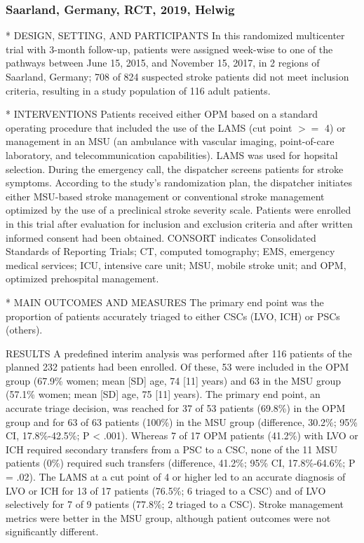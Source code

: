 \subsubsection{Saarland, Germany, RCT, 2019, Helwig \cite{helwig_prehospital_2019}}

\begin{markdown}
* DESIGN, SETTING, AND PARTICIPANTS In this randomized multicenter trial with 3-month follow-up, patients were assigned week-wise to one of the pathways between June 15, 2015, and November 15, 2017, in 2 regions of Saarland, Germany; 708 of 824 suspected stroke patients did not meet inclusion criteria, resulting in a study population of 116 adult patients.

* INTERVENTIONS Patients received either OPM based on a standard operating procedure that included the use of the LAMS (cut point $>=$ 4) or management in an MSU (an ambulance with vascular imaging, point-of-care laboratory, and telecommunication capabilities). LAMS was used for hopsital selection. During the emergency call, the dispatcher screens patients for stroke symptoms. According to the study’s randomization plan, the dispatcher initiates either MSU-based stroke management or conventional stroke management optimized by the use of a preclinical stroke severity scale. Patients were enrolled in this trial after evaluation for inclusion and exclusion criteria and after written informed consent had been obtained. CONSORT indicates Consolidated Standards of Reporting Trials; CT, computed tomography; EMS, emergency medical services; ICU, intensive care unit; MSU, mobile stroke unit; and OPM, optimized prehospital management. 

* MAIN OUTCOMES AND MEASURES The primary end point was the proportion of patients accurately triaged to either CSCs (LVO, ICH) or PSCs (others). 

RESULTS A predefined interim analysis was performed after 116 patients of the planned 232 patients had been enrolled. Of these, 53 were included in the OPM group (67.9\% women; mean [SD] age, 74 [11] years) and 63 in the MSU group (57.1\% women; mean [SD] age, 75 [11] years). The primary end point, an accurate triage decision, was reached for 37 of 53 patients (69.8\%) in the OPM group and for 63 of 63 patients (100\%) in the MSU group (difference, 30.2\%; 95\% CI, 17.8\%-42.5\%; P < .001). Whereas 7 of 17 OPM patients (41.2\%) with LVO or ICH required secondary transfers from a PSC to a CSC, none of the 11 MSU patients (0\%) required such transfers (difference, 41.2\%; 95\% CI, 17.8\%-64.6\%; P = .02). The LAMS at a cut point of 4 or higher led to an accurate diagnosis of LVO or ICH for 13 of 17 patients (76.5\%; 6 triaged to a CSC) and of LVO selectively for 7 of 9 patients (77.8\%; 2 triaged to a CSC). Stroke management metrics were better in the MSU group, although patient outcomes were not significantly different.

\end{markdown}

